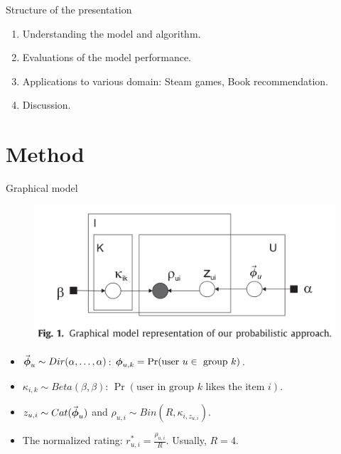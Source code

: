 \documentclass{beamer}
\begin{document}
\begin{frame}{Structure of the presentation}
	\begin{enumerate}
        \item Understanding the model and algorithm.
        \item Evaluations of the model performance.
		\item Applications to various domain: Steam games, Book recommendation.
		\item Discussion.
	\end{enumerate}
\end{frame}

\section{Method}

\begin{frame}{Graphical model}
	\begin{figure}
		\centering
		\includegraphics[width=0.7\linewidth]{fig/graphical}
		\label{fig:table9}
	\end{figure}
    \begin{itemize}
        \item $ \vec{\mbox{\boldmath{$\phi$}}}_u \sim Dir(\alpha, \dots, \alpha) $: $ \mbox{\boldmath{$\phi$}}_{u, k} = \Pr(\text{user }u \in \text{ group } k)$. 
        \item $ \kappa_{i, k} \sim Beta(\beta, \beta) $: 
        $ \Pr(\text{user in group }k \text{ likes the item } i)$.
        \item $ z_{u, i} \sim Cat(\vec{\mbox{\boldmath{$\phi$}}}_u) $ and $ \rho_{u, i} \sim Bin(R, \kappa_{i, z_{u, i}}) $.
        \item The normalized rating: $r^*_{u, i} = \frac{\rho_{u, i}}{R}$. Usually, $R = 4$.
    \end{itemize}
\end{frame}
\end{document}
